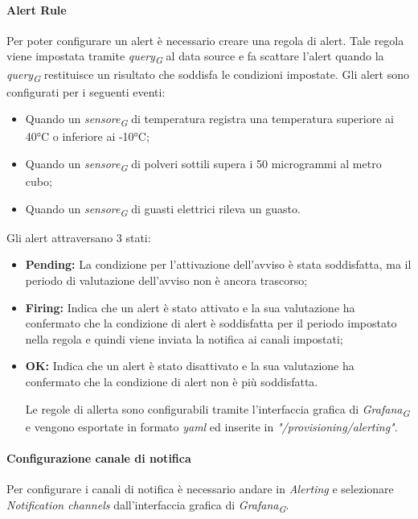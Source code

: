 \paragraph{Alert Rule}
Per poter configurare un alert è necessario creare una regola di alert. Tale regola viene impostata tramite \textit{query}\textsubscript{\textit{G}} al data source e fa scattare l'alert quando la \textit{query}\textsubscript{\textit{G}} restituisce un risultato che soddisfa le condizioni impostate.
Gli alert sono configurati per i seguenti eventi:
\begin{itemize}
    \item Quando un \textit{sensore}\textsubscript{\textit{G}} di temperatura registra una temperatura superiore ai 40°C o inferiore ai -10°C;
    \item Quando un \textit{sensore}\textsubscript{\textit{G}} di polveri sottili supera i 50 microgrammi al metro cubo;
    \item Quando un \textit{sensore}\textsubscript{\textit{G}} di guasti elettrici rileva un guasto.
\end{itemize}

Gli alert attraversano 3 stati:
\begin{itemize}
    \item \textbf{Pending:} La condizione per l'attivazione dell'avviso è stata soddisfatta, ma il periodo di valutazione dell'avviso non è ancora trascorso;
    \item \textbf{Firing:} Indica che un alert è stato attivato e la sua valutazione ha confermato che la condizione di alert è soddisfatta per il periodo impostato nella regola e quindi viene inviata la notifica ai canali impostati;
    \item \textbf{OK:} Indica che un alert è stato disattivato e la sua valutazione ha confermato che la condizione di alert non è più soddisfatta.

Le regole di allerta sono configurabili tramite l'interfaccia grafica di \textit{Grafana}\textsubscript{\textit{G}} e vengono esportate in formato \textit{yaml} ed inserite in \textit{"/provisioning/alerting"}.
                            
\end{itemize}

\paragraph{Configurazione canale di notifica}
Per configurare i canali di notifica è necessario andare in \textit{Alerting} e selezionare \textit{Notification channels} dall'interfaccia grafica di \textit{Grafana}\textsubscript{\textit{G}}.

